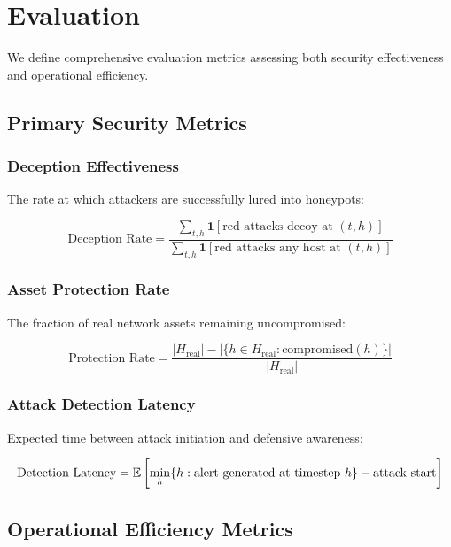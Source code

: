 \documentclass[12pt,twoside]{article}
\theoremstyle{definition}
\theoremstyle{plain}
\begin{document}
\section{Evaluation}

We define comprehensive evaluation metrics assessing both security effectiveness and operational efficiency.

\subsection{Primary Security Metrics}

\subsubsection{Deception Effectiveness}
The rate at which attackers are successfully lured into honeypots:

\begin{equation}
\text{Deception Rate} = \frac{\sum_{t,h} \mathbf{1}[\text{red attacks decoy at } (t,h)]}{\sum_{t,h} \mathbf{1}[\text{red attacks any host at } (t,h)]}
\end{equation}

\subsubsection{Asset Protection Rate}
The fraction of real network assets remaining uncompromised:

\begin{equation}
\text{Protection Rate} = \frac{|H_{\text{real}}| - |\{h \in H_{\text{real}} : \text{compromised}(h)\}|}{|H_{\text{real}}|}
\end{equation}

\subsubsection{Attack Detection Latency}
Expected time between attack initiation and defensive awareness:

\begin{equation}
\text{Detection Latency} = \mathbb{E}\left[\min_h \{h : \text{alert generated at timestep } h\} - \text{attack start}\right]
\end{equation}

\subsection{Operational Efficiency Metrics}
\end{document}

